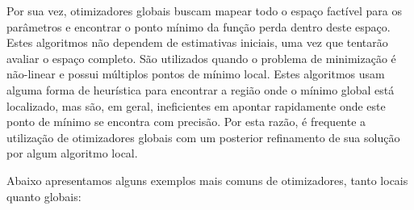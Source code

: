 \documentclass[]{book}
\begin{document}
Por sua vez, otimizadores globais buscam mapear todo o espaço factível
para os parâmetros e encontrar o ponto mínimo da função perda dentro
deste espaço. Estes algoritmos não dependem de estimativas iniciais, uma
vez que tentarão avaliar o espaço completo. São utilizados quando o
problema de minimização é não-linear e possui múltiplos pontos de mínimo
local. Estes algoritmos usam alguma forma de heurística para encontrar a
região onde o mínimo global está localizado, mas são, em geral,
ineficientes em apontar rapidamente onde este ponto de mínimo se
encontra com precisão. Por esta razão, é frequente a utilização de
otimizadores globais com um posterior refinamento de sua solução por
algum algoritmo local.

Abaixo apresentamos alguns exemplos mais comuns de otimizadores, tanto
locais quanto globais:
\end{document}
